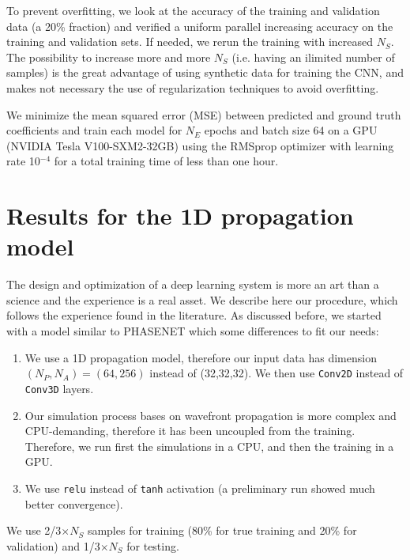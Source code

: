 \documentclass[preprint]{iucr}
\begin{document}
To prevent overfitting, we look at the accuracy of the training and validation data (a 20\% fraction) and verified a uniform parallel increasing accuracy on the training and validation sets. If needed, we rerun the training with increased $N_S$. The possibility to increase more and more $N_S$ (i.e. having an ilimited number of samples) is the great advantage of using synthetic data for training the CNN, and makes not necessary the use of regularization techniques to avoid overfitting.

We minimize the mean squared error (MSE) between predicted and ground truth coefficients and train each model for $N_E$ epochs and batch size 64 on a GPU (NVIDIA Tesla V100-SXM2-32GB) using the RMSprop optimizer with learning rate 10$^{-4}$ for a total training time of less than one hour.


\section{Results for the 1D propagation model}\label{sec:results}

The design and optimization of a deep learning system is more an art than a science \cite{chollet_book} and the experience is a real asset. We describe here our procedure, which follows the experience found in the literature. As discussed before, we started with a model similar to PHASENET \cite{Saha2020} which some differences to fit our needs: 
\begin{enumerate}
    \item We use a 1D propagation model, therefore our input data has dimension $(N_P,N_A)=(64,256)$ instead of (32,32,32). We then use \texttt{Conv2D} instead of \texttt{Conv3D} layers. 
    \item Our simulation process bases on wavefront propagation is more complex and CPU-demanding, therefore it has been uncoupled from the training. Therefore, we run first the simulations in a CPU, and then the training in a GPU.
    \item We use \texttt{relu} instead of \texttt{tanh} activation (a preliminary run showed much better convergence). 
\end{enumerate}

 We use 2/3$\times N_S$ samples for training (80\% for true training and 20\% for validation) and 1/3$\times N_S$ for testing. 
 
\end{document}
